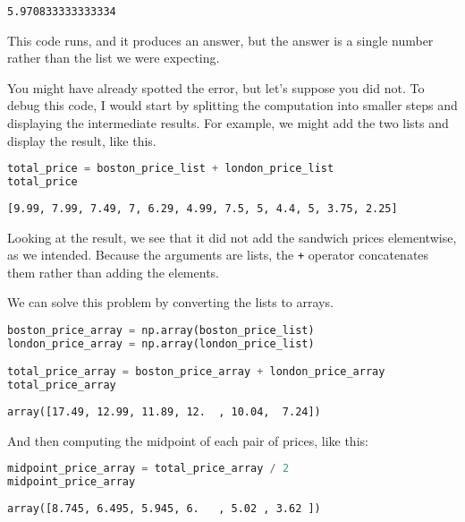 \begin{lstlisting}[style=output]
5.970833333333334
\end{lstlisting}

This code runs, and it produces an answer, but the answer is a single
number rather than the list we were expecting.

You might have already spotted the error, but let's suppose you did not.
To debug this code, I would start by splitting the computation into
smaller steps and displaying the intermediate results. For example, we
might add the two lists and display the result, like this.

\begin{lstlisting}[language=Python,style=source]
total_price = boston_price_list + london_price_list
total_price
\end{lstlisting}

\begin{lstlisting}[style=output]
[9.99, 7.99, 7.49, 7, 6.29, 4.99, 7.5, 5, 4.4, 5, 3.75, 2.25]
\end{lstlisting}

Looking at the result, we see that it did not add the sandwich prices
elementwise, as we intended. Because the arguments are lists, the
\passthrough{\lstinline!+!} operator concatenates them rather than
adding the elements.

We can solve this problem by converting the lists to arrays.

\begin{lstlisting}[language=Python,style=source]
boston_price_array = np.array(boston_price_list)
london_price_array = np.array(london_price_list)

total_price_array = boston_price_array + london_price_array
total_price_array
\end{lstlisting}

\begin{lstlisting}[style=output]
array([17.49, 12.99, 11.89, 12.  , 10.04,  7.24])
\end{lstlisting}

And then computing the midpoint of each pair of prices, like this:

\begin{lstlisting}[language=Python,style=source]
midpoint_price_array = total_price_array / 2
midpoint_price_array
\end{lstlisting}

\begin{lstlisting}[style=output]
array([8.745, 6.495, 5.945, 6.   , 5.02 , 3.62 ])
\end{lstlisting}

